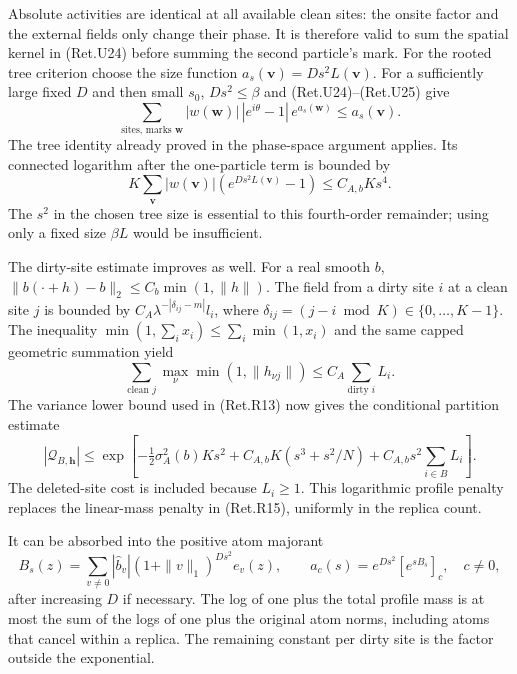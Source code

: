Absolute activities are identical at all available clean sites:
the onsite factor and the external fields only change their phase.
It is therefore valid to sum the spatial kernel in (Ret.U24) before
summing the second particle's mark. For the rooted tree criterion
choose the size function
\(a_s(\boldsymbol v)=D s^2 L(\boldsymbol v)\).
For a sufficiently large fixed \(D\) and then small \(s_0\),
\(D s^2\le\beta\) and (Ret.U24)--(Ret.U25) give
\[
 \sum_{\text{sites, marks }\boldsymbol w}
       |w(\boldsymbol w)|\,|e^{i\theta}-1|\,
                               e^{a_s(\boldsymbol w)}
                         \le a_s(\boldsymbol v).
\]
The tree identity already proved in the phase-space argument applies.
Its connected logarithm after the one-particle term is bounded by
\[
 K\sum_{\boldsymbol v}|w(\boldsymbol v)|
                     (e^{D s^2L(\boldsymbol v)}-1)
                      \le C_{A,b}Ks^4.                  \tag{Ret.U26}
\]
The \(s^2\) in the chosen tree size is essential to this fourth-order
remainder; using only a fixed size \(\beta L\) would be insufficient.

The dirty-site estimate improves as well. For a real smooth \(b\),
\(\|b(\cdot+h)-b\|_2\le C_b\min(1,\|h\|)\).
The field from a dirty site \(i\) at a clean site \(j\) is bounded by
\(C_A\lambda^{-|\delta_{ij}-m|}l_i\), where
\(\delta_{ij}=(j-i\bmod K)\in\{0,\ldots,K-1\}\).
The inequality \(\min(1,\sum_i x_i)\le\sum_i\min(1,x_i)\) and the
same capped geometric summation yield
\[
 \sum_{\text{clean }j}\max_\nu\min(1,\|h_{\nu j}\|)
                           \le C_A\sum_{\text{dirty }i}L_i .
\]
The variance lower bound used in (Ret.R13) now gives the conditional
partition estimate
\[
 |\mathcal Q_{B,\boldsymbol h}|
 \le\exp\left[-\tfrac12\sigma_A^2(b)Ks^2
       +C_{A,b}K(s^3+s^2/N)
       +C_{A,b}s^2\sum_{i\in B}L_i\right].               \tag{Ret.U27}
\]
The deleted-site cost is included because \(L_i\ge1\).
This logarithmic profile penalty replaces the linear-mass penalty
in (Ret.R15), uniformly in the replica count.

It can be absorbed into the positive atom majorant
\[
 B_s(z)=\sum_{v\ne0}|\widehat b_v|(1+\|v\|_1)^{D s^2}e_v(z),
 \qquad a_c(s)=e^{D s^2}[e^{sB_s}]_c,\quad c\ne0,         \tag{Ret.U28}
\]
after increasing \(D\) if necessary.
The log of one plus the total profile mass is at most the sum
of the logs of one plus the original atom norms, including atoms
that cancel within a replica. The remaining constant per dirty site
is the factor outside the exponential.


